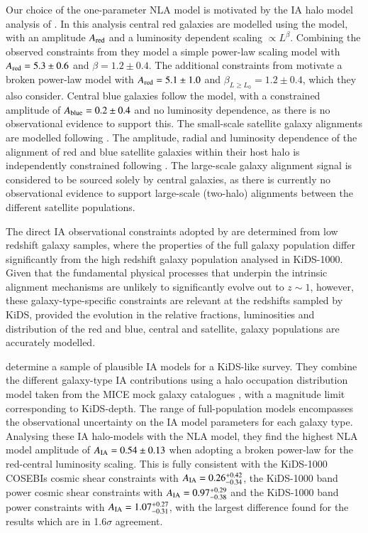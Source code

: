 \begin{appendix}
Our choice of the one-parameter NLA model is motivated by the IA halo model analysis of \citet{fortuna/etal:2020}.   In this analysis central red galaxies are modelled using the  \citet{hirata/seljak:2004} model, with an amplitude $A_{\rm red}$ and a luminosity dependent scaling $\propto L^\beta$.   Combining the observed constraints from \citet{joachimi/etal:2011, singh/etal:2015} they model a simple power-law scaling model with $A_{\rm red} = 5.3 \pm 0.6$ and $\beta=1.2 \pm 0.4$.   The additional constraints from \citet{johnston/etal:2019} motivate a broken power-law model with $A_{\rm red} = 5.1 \pm 1.0$ and $\beta_{L \geq L_0}=1.2 \pm 0.4$, which they also consider.    Central blue galaxies follow the \citet{hirata/seljak:2004} model, with a \citet{johnston/etal:2019} constrained amplitude of $A_{\rm blue} = 0.2 \pm 0.4$ and no luminosity dependence, as there is no observational evidence to support this.    The small-scale satellite galaxy alignments are modelled following \citet{schneider/bridle:2010}.  The amplitude, radial and luminosity dependence of the alignment of red and blue satellite galaxies within their host halo is independently constrained following \citet{georgiou/etal:2019}.     The large-scale galaxy alignment signal is considered to be sourced solely by central galaxies, as there is currently no observational evidence to support large-scale (two-halo) alignments between the different satellite populations.

The direct IA observational constraints adopted by \citet{fortuna/etal:2020} are determined from low redshift galaxy samples, where the properties of the full galaxy population differ significantly from the high redshift galaxy population analysed in KiDS-1000.  Given that the fundamental physical processes that underpin the intrinsic alignment mechanisms are unlikely to significantly evolve out to $z \sim 1$, however, these galaxy-type-specific constraints are relevant at the redshifts sampled by KiDS, provided the evolution in the relative fractions, luminosities and distribution of the red and blue, central and satellite, galaxy populations are accurately modelled.   

\citet{fortuna/etal:2020} determine a sample of plausible IA models for a KiDS-like survey.  They combine the different galaxy-type IA contributions using a halo occupation distribution model taken from the MICE mock galaxy catalogues \citep{fosalba/etal:2015}, with a magnitude limit corresponding to KiDS-depth.   The range of full-population models encompasses the observational uncertainty on the IA model parameters for each galaxy type.    Analysing these IA halo-models with the NLA model, they find the highest NLA model amplitude of $A_{\rm IA}=0.54 \pm 0.13$ when adopting a broken power-law for the red-central luminosity scaling.    This is fully consistent with the \citet{asgari/etal:2020} KiDS-1000 COSEBIs cosmic shear constraints with $A_{\rm IA}=0.26 ^{+0.42}_{-0.34}$, the KiDS-1000 band power cosmic shear constraints with $A_{\rm IA}=0.97 ^{+0.29}_{-0.38}$ and the KiDS-1000 \tttp band power constraints with $A_{\rm IA}=1.07^{+0.27}_{-0.31}$, with the largest difference found for the \tttp results which are in 1.6$\sigma$ agreement.    


\end{appendix}
